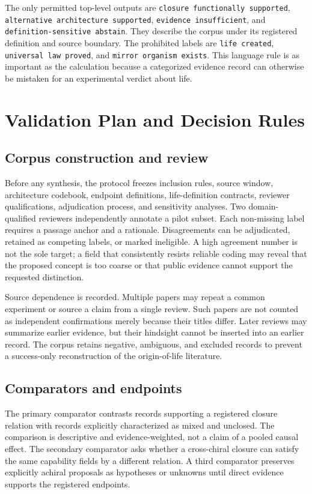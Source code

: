 \documentclass[conference]{IEEEtran}
\begin{document}
The only permitted top-level outputs are \texttt{closure functionally supported}, \texttt{alternative architecture supported}, \texttt{evidence insufficient}, and \texttt{definition-sensitive abstain}. They describe the corpus under its registered definition and source boundary. The prohibited labels are \texttt{life created}, \texttt{universal law proved}, and \texttt{mirror organism exists}. This language rule is as important as the calculation because a categorized evidence record can otherwise be mistaken for an experimental verdict about life.

\section{Validation Plan and Decision Rules}

\subsection{Corpus construction and review}

Before any synthesis, the protocol freezes inclusion rules, source window, architecture codebook, endpoint definitions, life-definition contracts, reviewer qualifications, adjudication process, and sensitivity analyses. Two domain-qualified reviewers independently annotate a pilot subset. Each non-missing label requires a passage anchor and a rationale. Disagreements can be adjudicated, retained as competing labels, or marked ineligible. A high agreement number is not the sole target; a field that consistently resists reliable coding may reveal that the proposed concept is too coarse or that public evidence cannot support the requested distinction.

Source dependence is recorded. Multiple papers may repeat a common experiment or source a claim from a single review. Such papers are not counted as independent confirmations merely because their titles differ. Later reviews may summarize earlier evidence, but their hindsight cannot be inserted into an earlier record. The corpus retains negative, ambiguous, and excluded records to prevent a success-only reconstruction of the origin-of-life literature.

\subsection{Comparators and endpoints}

The primary comparator contrasts records supporting a registered closure relation with records explicitly characterized as mixed and unclosed. The comparison is descriptive and evidence-weighted, not a claim of a pooled causal effect. The secondary comparator asks whether a cross-chiral closure can satisfy the same capability fields by a different relation. A third comparator preserves explicitly achiral proposals as hypotheses or unknowns until direct evidence supports the registered endpoints.
\end{document}
